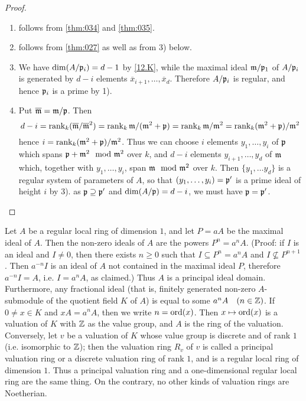 \documentclass[../main]{subfiles}
\begin{document}
\begin{proof}
\begin{enumerate}[label=(\arabic*)]
    \item follows from \ref{thm:034} and \ref{thm:035}.
    
    \item follows from \ref{thm:027} as well as from 3) below.
    
    \item We have $\operatorname{dim}(A / \mathfrak{p}_i)=d-1$ by \ref{12.K}, while the maximal ideal $\mathfrak{m}/ \mathfrak{p}_1$ of $A/ \mathfrak{p}_i$ is generated by $d-i$ elements $\overline{x}_{i+1}, \dots, \overline{x}_d$. Therefore $A/\mathfrak{p}_i$ is regular, and hence $\mathfrak{p}_i$ is a prime by 1).
    
    \item Put $\overline{\mathfrak{m}}=\mathfrak{m} / \mathfrak{p}$. Then \[d-i=\operatorname{rank}_k(\overline{\mathfrak{m}}/\overline{\mathfrak{m}}^2) = \operatorname{rank}_k \mathfrak{m}/(\mathfrak{m}^2+\mathfrak{p}) = \operatorname{rank}_k \mathfrak{m}/\mathfrak{m}^2 = \operatorname{rank}_k (\mathfrak{m}^2+\mathfrak{p})/\mathfrak{m}^2\] hence $i=\operatorname{rank}_k (\mathfrak{m}^2+\mathfrak{p})/\mathfrak{m}^2$. Thus we can choose $i$ elements $y_1,\dots, y_i$ of $\mathfrak{p}$ which spans $\ideal{p}+\ideal{m}^2 \mod \ideal{m}^2$ over $k$, and $d-i$ elements $y_{i+1},\dots , y_d$ of $\mathfrak{m}$ which, together with $y_1,\dots,y_i$, span $\ideal{m}\mod \ideal{m}^2$ over $k$. Then $\{y_1,\dots y_d\}$ is a regular system of parameters of $A$, so that $(y_1,\dots,y_i) =\mathfrak{p}'$ is a prime ideal of height $i$ by 3). as $\mathfrak{p}\supseteq \mathfrak{p}'$ and $\operatorname{dim}(A/\mathfrak{p})=d-i$, we must have $\mathfrak{p}=\mathfrak{p}'$.
\end{enumerate}
\end{proof}

\newparagraph Let $A$ be a regular local ring of dimension $1$, and let $P= aA$ be the maximal ideal of $A$. Then the non-zero ideals of $A$ are the powers $P^n=a^nA$. (Proof: if $I$ is an ideal and $I \neq 0$, then there exists $n \geqslant 0$ such that $I \subseteq P^n=a^n A$ and $I \nsubseteq P^{n+1}$. Then $a^{-n} I$ is an ideal of $A$ not contained in the maximal ideal $P$, therefore $a^{-n} I=A$, i.e. $I=a^n A$, as claimed.) Thus $A$ is a principal ideal domain. Furthermore, any fractional ideal (that is, finitely generated non-zero $A$-submodule of the quotient field $K$ of $A$) is equal to some $a^n A\for{n\in\bZ}$. If $0 \neq x \in K$ and $x A=a^n A$, then we write $n=\operatorname{ord}(x)$. Then $x \mapsto \operatorname{ord}(x)$ is a valuation of $K$ with $\mathbb{Z}$ as the value group, and $A$ is the ring of the valuation. Conversely, let $v$ be a valuation of $K$ whose value group is discrete and of rank $1$ (i.e. isomorphic to $\mathbb{Z}$); then the valuation ring $R_v$ of $v$ is called a principal valuation ring or a discrete valuation ring of rank $1$, and is a regular local ring of dimension $1$. Thus a principal valuation ring and a one-dimensional regular local ring are the same thing. On the contrary, no other kinds of valuation rings are Noetherian.
\end{document}
